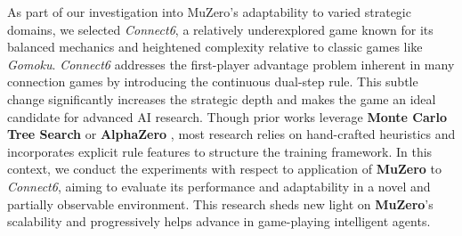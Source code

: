 As part of our investigation into MuZero's adaptability to varied strategic domains, we selected \emph{Connect6}, a relatively underexplored game 
known for its balanced mechanics and heightened complexity relative to classic games like \emph{Gomoku}. 
\emph{Connect6} addresses the first-player advantage problem inherent in many connection games by introducing the continuous dual-step rule. 
This subtle change significantly increases the strategic depth and makes the game an ideal candidate for advanced AI research. 
Though prior works leverage \textbf{Monte Carlo Tree Search} \cite{5740585} or \textbf{AlphaZero} \cite{Yang2020}, most research relies on hand-crafted 
heuristics and incorporates explicit rule features to structure the training framework.
In this context, we conduct the experiments with respect to application of \textbf{MuZero} to \emph{Connect6}, aiming to evaluate its performance and 
adaptability in a novel and partially observable environment. 
This research sheds new light on \textbf{MuZero}’s scalability and progressively helps advance in game-playing intelligent agents.